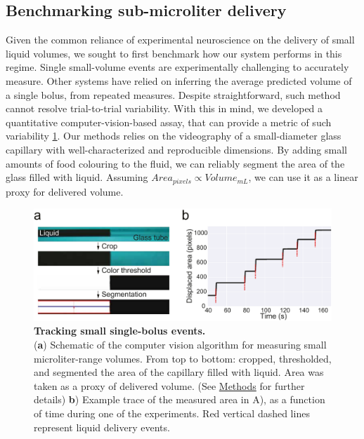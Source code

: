 \subsection*{Benchmarking sub-microliter delivery}

Given the common reliance of experimental neuroscience on the delivery of small liquid volumes, we sought to first benchmark how our system performs in this regime. Single small-volume events are experimentally challenging to accurately measure. Other systems have relied on inferring the average predicted volume of a single bolus, from repeated measures. Despite straightforward, such method cannot resolve trial-to-trial variability. With this in mind, we developed a quantitative computer-vision-based assay, that can provide a metric of such variability \ref{fig:PumpProtocol}. Our methods relies on the videography of a small-diameter glass capillary with well-characterized and reproducible dimensions. By adding small amounts of food colouring to the fluid, we can reliably segment the area of the glass filled with liquid. Assuming $Area_{pixels} \propto Volume_{mL}$, we can use it as a linear proxy for delivered volume. 

\begin{figure} 
	\centering
	\includegraphics[width=1.0\linewidth]{Figures/Artboard 1_1.pdf}
	\caption{\textbf{Tracking small single-bolus events.}\\
		(\textbf{a}) Schematic of the computer vision algorithm for measuring small microliter-range volumes. From top to bottom: cropped, thresholded, and segmented the area of the capillary filled with liquid. Area was taken as a proxy of delivered volume. (See \hyperref[s:methods]{Methods} for further details)  \textbf{b}) Example trace of the measured area in A), as a function of time during one of the experiments. Red vertical dashed lines represent liquid delivery events.}
	\label{fig:PumpProtocol}  
\end{figure}

